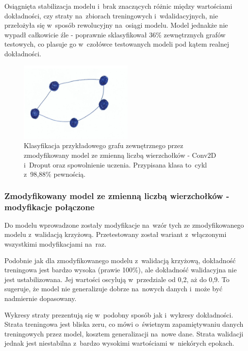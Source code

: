 Osiągnięta stabilizacja modelu i~brak znaczących różnic między wartościami dokładności,
czy straty na~zbiorach treningowych i~wdalidacyjnych, nie przełożyła się w~sposób rewolucyjny na~osiągi modelu.
Model jednakże nie wypadł całkowicie źle - poprawnie sklasyfikował 36\% zewnętrznych grafów testowych,
co plasuje go w~czołówce testowanych modeli pod kątem realnej dokładności.

\begin{figure}[ht]
	\centering
	\includegraphics[height=4cm]{../graph_classification/test_graphs/drawn/cycle-7.png}
	\caption{Klasyfikacja przykładowego grafu zewnętrznego przez zmodyfikowany model ze zmienną liczbą wierzchołków
		- Conv2D i~Droput oraz spowolnienie uczenia.
		Przypisana klasa to~cykl z~98,88\% pewnością.}
	\label{Fig:tests-var-1d}
\end{figure}
\FloatBarrier

\subsubsection{Zmodyfikowany model ze zmienną liczbą wierzchołków - modyfikacje połączone}

Do modelu wprowadzone zostały modyfikacje na~wzór tych ze zmodyfikowanego modelu z~walidacją krzyżową.
Przetestowany został wariant z~włączonymi wszystkimi modyfikacjami na~raz.

Podobnie jak dla zmodyfikowanego modelu z~walidacją krzyżową, dokładność treningowa jest bardzo wysoka (prawie 100\%),
ale dokładność walidacyjna nie jest ustabilizowana. Jej wartości oscylują w~przedziale od 0,2, aż do 0,9.
To sugeruje, że model nie generalizuje dobrze na~nowych danych i~może być nadmiernie dopasowany.

Wykresy straty prezentują się w~podobny sposób jak i~wykresy dokładności.
Strata treningowa jest bliska zeru, co mówi o~świetnym zapamiętywaniu danych treningowych przez model, kosztem generalizacji na~nowe dane.
Strata walidacji jednak jest niestabilna z~bardzo wysokimi wartościami w~niekórych epokach.

